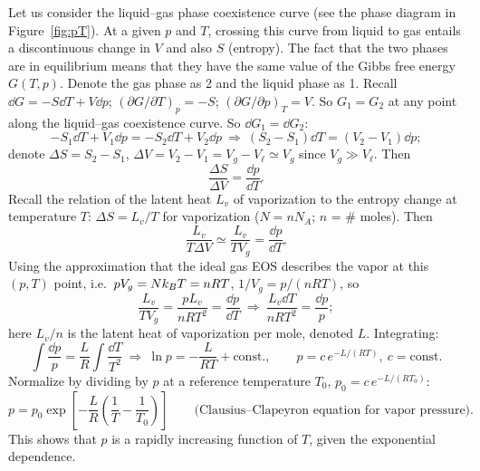 Let us consider the liquid--gas phase coexistence curve (see the phase diagram in Figure~\ref{fig:pT}). At a given $p$ and $T$, crossing this curve from liquid to gas entails a discontinuous change in $V$
and also $S$ (entropy). The fact that the two phases are in equilibrium means that they have the same value of the
Gibbs free energy $G(T,p)$. Denote the gas phase as 2 and the liquid phase as 1. Recall
$\dd G = -S\dd T + V\dd p$; $\left(\partial G/\partial T\right)_p = -S$; $\left(\partial G/\partial p\right)_T = V$. So
$G_1 = G_2$ at any point along the liquid--gas coexistence curve. So $\dd G_1 = \dd G_2$:
\begin{equation}
  -S_1\dd T + V_1\dd p = -S_2\dd T + V_2\dd p\ \Rightarrow\ (S_2-S_1)\dd T = (V_2-V_1)\dd p;
\end{equation}
denote $\Delta S = S_2-S_1$, $\Delta V = V_2-V_1 = V_g-V_\ell\simeq V_g$ since $V_g\gg V_\ell$. Then
\begin{equation}
  \frac{\Delta S}{\Delta V} = \frac{\dd p}{\dd T}.
\end{equation}
Recall the relation of the latent heat $L_v$ of vaporization to the entropy change at temperature $T$:
$\Delta S = L_v/T$ for vaporization ($N = nN_A$; $n$ = \# moles). Then
\begin{equation}
  \frac{L_v}{T\Delta V}\simeq\frac{L_v}{TV_g} = \frac{\dd p}{\dd T}.
\end{equation}
Using the approximation that the ideal gas EOS describes the vapor at this $(p,T)$ point, i.e.\
$pV_g = Nk_{B} T = nRT$, $1/V_g = p/(nRT)$, so
\begin{equation}
  \frac{L_v}{TV_g} = \frac{pL_v}{nRT^2} = \frac{\dd p}{\dd T}\ \Rightarrow\ \frac{L_v\dd T}{nRT^2} = \frac{\dd p}{p};
\end{equation}
here $L_v/n$ is the latent heat of vaporization per mole, denoted $L$. Integrating:
\begin{equation}
  \int\frac{\dd p}{p} = \frac{L}{R}\int\frac{\dd T}{T^2}\ \Rightarrow\ \ln p = -\frac{L}{RT} + \text{const.},\qquad
  \boxed{p = c\,e^{-L/(RT)},\ c = \text{const.}}
\end{equation}
Normalize by dividing by $p$ at a reference temperature $T_0$, $p_0 = c\,e^{-L/(RT_0)}$:
\begin{equation}
  \boxed{p = p_0\exp\left[-\frac{L}{R}\left(\frac{1}{T}-\frac{1}{T_0}\right)\right]}\qquad\text{(Clausius--Clapeyron equation for vapor pressure)}.
\end{equation}
This shows that $p$ is a rapidly increasing function of $T$, given the exponential dependence.

